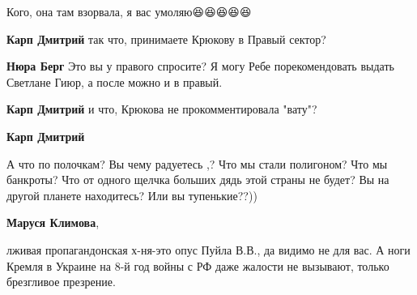 \begin{itemize}
\begin{itemize}
 
Кого, она там взорвала, я вас умоляю😆😆😆😆😆

 

\textbf{Карп Дмитрий} так что, принимаете Крюкову в Правый сектор?

 

\textbf{Нюра Берг} Это вы у правого спросите? Я могу Ребе порекомендовать выдать Светлане Гиюр, а после можно и в правый.

 
\textbf{Карп Дмитрий} и что, Крюкова не прокомментировала "вату"?

 
\textbf{Карп Дмитрий} 

А что по полочкам? Вы чему радуетесь ,? Что мы стали полигоном? Что мы банкроты?
Что от одного щелчка больших дядь этой страны не будет? Вы на другой планете
находитесь? Или вы тупенькие??))


 
\textbf{Маруся Климова}, 

лживая пропагандонская х-ня-это опус Пуйла В.В., да видимо не для вас. А ноги
Кремля в Украине на 8-й год войны с РФ даже жалости не вызывают, только
брезгливое презрение.



\end{itemize}
\end{itemize}

